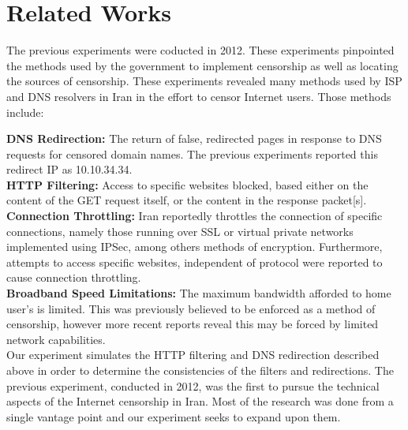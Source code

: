 \section{Related Works}\label{sec:relatedworks}
The previous experiments were coducted in 2012. These experiments pinpointed the methods used by the government to implement censorship as well as locating the sources of censorship. These experiments revealed many methods used by ISP and DNS resolvers in Iran in the effort to censor Internet users. Those methods include:

\textbf{DNS Redirection:} The return of false, redirected pages in response to DNS requests for censored domain names. The previous experiments reported this redirect IP as 10.10.34.34.\\
\textbf{HTTP Filtering:} Access to specific websites blocked, based either on the content of the GET request itself, or the content in the response packet[s].\\
\textbf{Connection Throttling:} Iran reportedly throttles the connection of specific connections, namely those running over SSL or virtual private networks implemented using IPSec, among others methods of encryption. Furthermore, attempts to access specific websites, independent of protocol were reported to cause connection throttling.\\
\textbf{Broadband Speed Limitations:} The maximum bandwidth afforded to home user’s is limited. This was previously believed to be enforced as a method of censorship, however more recent reports reveal this may be forced by limited network capabilities.\\
Our experiment simulates the HTTP filtering and DNS redirection described above in order to determine the consistencies of the filters and redirections. The previous experiment, conducted in 2012, was the first to pursue the technical aspects of the Internet censorship in Iran. Most of the research was done from a single vantage point and our experiment seeks to expand upon them.\\
